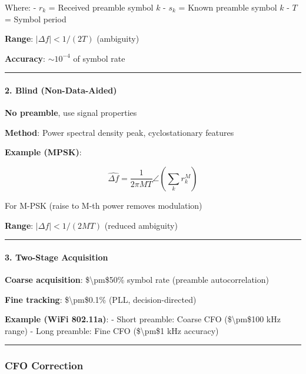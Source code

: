 Where: - \(r_k\) = Received preamble symbol \(k\) - \(s_k\) = Known
preamble symbol \(k\) - \(T\) = Symbol period

\textbf{Range}: \(|\Delta f| < 1/(2T)\) (ambiguity)

\textbf{Accuracy}: \(\sim 10^{-4}\) of symbol rate

\begin{center}\rule{0.5\linewidth}{0.5pt}\end{center}

\paragraph{2. Blind (Non-Data-Aided)}\label{blind-non-data-aided}

\textbf{No preamble}, use signal properties

\textbf{Method}: Power spectral density peak, cyclostationary features

\textbf{Example (MPSK)}:

\[
\hat{\Delta f} = \frac{1}{2\pi M T} \angle \left(\sum_{k} r_k^M\right)
\]

For M-PSK (raise to M-th power removes modulation)

\textbf{Range}: \(|\Delta f| < 1/(2MT)\) (reduced ambiguity)

\begin{center}\rule{0.5\linewidth}{0.5pt}\end{center}

\paragraph{3. Two-Stage Acquisition}\label{two-stage-acquisition}

\textbf{Coarse acquisition}: \$\textbackslash pm\$50\% symbol rate
(preamble autocorrelation)

\textbf{Fine tracking}: \$\textbackslash pm\$0.1\% (PLL,
decision-directed)

\textbf{Example (WiFi 802.11a)}: - Short preamble: Coarse CFO
(\$\textbackslash pm\$100 kHz range) - Long preamble: Fine CFO
(\$\textbackslash pm\$1 kHz accuracy)

\begin{center}\rule{0.5\linewidth}{0.5pt}\end{center}

\subsubsection{CFO Correction}\label{cfo-correction}

